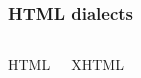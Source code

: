 \begin{frame}
 	\frametitle{HTML dialects}
	\begin{columns}
		\fontsize{36pt}{12pt}\selectfont
			\begin{center}
 				HTML		
			\end{center}
			\begin{center}
 				XHTML		
			\end{center}
	\end{columns}
\end{frame}